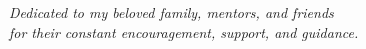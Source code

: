 \newpage
\thispagestyle{empty}

\vspace*{7cm}

\begin{center}
    \large
    \textit{Dedicated to my beloved family, mentors, and friends \\
    for their constant encouragement, support, and guidance.}
\end{center}
